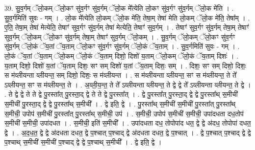 \documentclass[17pt]{extarticle}
\begin{document}
39. सु॒व॒र्गम् ॅलो॒कम् ॅलो॒कꣳ सु॑व॒र्गꣳ सु॑व॒र्गम् ॅलो॒क मे᳚त्येति लो॒कꣳ सु॑व॒र्गꣳ सु॑व॒र्गम् ॅलो॒क मे॑ति । . सु॒व॒र्गमिति॑ सुवः - गम् । . लो॒क मे᳚त्येति लो॒कम् ॅलो॒क मे॑ति॒ तेषा॒म् तेषा॑ मेति लो॒कम् ॅलो॒क मे॑ति॒ तेषा᳚म् । . ए॒ति॒ तेषा॒म् तेषा॑ मेत्येति॒ तेषाꣳ॑ सुव॒र्गꣳ सु॑व॒र्गम् तेषा॑ मेत्येति॒ तेषाꣳ॑ सुव॒र्गम् । . तेषाꣳ॑ सुव॒र्गꣳ सु॑व॒र्गम् तेषा॒म् तेषाꣳ॑ सुव॒र्गम् ॅलो॒कम् ॅलो॒कꣳ सु॑व॒र्गम् तेषा॒म् तेषाꣳ॑ सुव॒र्गम् ॅलो॒कम् । . सु॒व॒र्गम् ॅलो॒कम् ॅलो॒कꣳ सु॑व॒र्गꣳ सु॑व॒र्गम् ॅलो॒कं ॅय॒तां ॅय॒ताम् ॅलो॒कꣳ सु॑व॒र्गꣳ सु॑व॒र्गम् ॅलो॒कं ॅय॒ताम् । . सु॒व॒र्गमिति॑ सुवः - गम् । . लो॒कं ॅय॒तां ॅय॒ताम् ॅलो॒कम् ॅलो॒कं ॅय॒ताम् दिशो॒ दिशो॑ य॒ताम् ॅलो॒कम् ॅलो॒कं ॅय॒ताम् दिशः॑ । . य॒ताम् दिशो॒ दिशो॑ य॒तां ॅय॒ताम् दिशः॒ सꣳ सम् दिशो॑ य॒तां ॅय॒ताम् दिशः॒ सम् । . दिशः॒ सꣳ सम् दिशो॒ दिशः॒ स म॑व्लीयन्ता व्लीयन्त॒ सम् दिशो॒ दिशः॒ स म॑व्लीयन्त । . स म॑व्लीयन्ता व्लीयन्त॒ सꣳ स म॑व्लीयन्त॒ ते ते᳚ ऽव्लीयन्त॒ सꣳ स म॑व्लीयन्त॒ ते । . अ॒व्ली॒य॒न्त॒ ते ते᳚ ऽव्लीयन्ता व्लीयन्त॒ ते द्वे द्वे ते᳚ ऽव्लीयन्ता व्लीयन्त॒ ते द्वे । . ते द्वे द्वे ते ते द्वे पु॒रस्ता᳚त् पु॒रस्ता॒द् द्वे ते ते द्वे पु॒रस्ता᳚त् । . द्वे पु॒रस्ता᳚त् पु॒रस्ता॒द् द्वे द्वे पु॒रस्ता᳚थ् स॒मीची॑ स॒मीची॑ पु॒रस्ता॒द् द्वे द्वे पु॒रस्ता᳚थ् स॒मीची᳚ । . द्वे इति॒ द्वे । . पु॒रस्ता᳚थ् स॒मीची॑ स॒मीची॑ पु॒रस्ता᳚त् पु॒रस्ता᳚थ् स॒मीची॒ उपोप॑ स॒मीची॑ पु॒रस्ता᳚त् पु॒रस्ता᳚थ् स॒मीची॒ उप॑ । . स॒मीची॒ उपोप॑ स॒मीची॑ स॒मीची॒ उपा॑दधता दध॒तोप॑ स॒मीची॑ स॒मीची॒ उपा॑दधत । . स॒मीची॒ इति॑ स॒मीची᳚ । . उपा॑दधता दध॒ तोपोपा॑द धत॒ द्वे द्वे अ॑दध॒ तोपोपा॑ दधत॒ द्वे । . अ॒द॒ध॒त॒ द्वे द्वे अ॑दधता दधत॒ द्वे प॒श्चात् प॒श्चाद् द्वे अ॑दधता दधत॒ द्वे प॒श्चात् । . द्वे प॒श्चात् प॒श्चाद् द्वे द्वे प॒श्चाथ् स॒मीची॑ स॒मीची॑ प॒श्चाद् द्वे द्वे प॒श्चाथ् स॒मीची᳚ । . द्वे इति॒ द्वे । \newline
\pagebreak
{}
\end{document}

